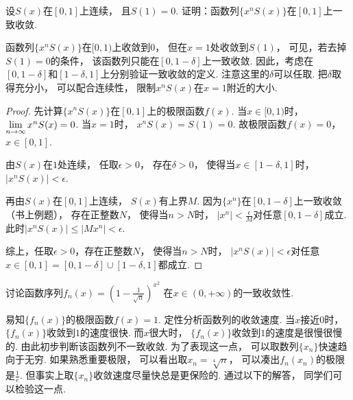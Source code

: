 \begin{example}
\label{ex:ch10-17}
设$S(x)$在$[0,1]$上连续，
        且$S(1)=0$.
        证明：函数列$\{ x^n S(x)\}$在$[0,1]$上一致收敛.
\end{example}

\begin{analysis}
函数列$\{ x^n S(x) \}$在$[0,1)$上收敛到$0$，
    但在$x=1$处收敛到$S(1)$，
    可见，若去掉$S(1)=0$的条件，
    该函数列只能在$[0,1-\delta]$上一致收敛.
    因此，考虑在$[0,1-\delta]$和$[1-\delta,1]$上分别验证一致收敛的定义.
    注意这里的$\delta$可以任取.
    把$\delta$取得充分小，
    可以配合连续性，
    限制$x^n S(x)$在$x=1$附近的大小.
\end{analysis}

\begin{proof}
先计算$\{ x^n S(x) \}$在$[0,1]$上的极限函数$f(x)$.
    当$x \in [0,1)$时，
    $\lim\limits_{n \to \infty} x^n S(x) = 0$.
    当$x=1$时，
    $x^n S(x) = S(1) = 0$.
    故极限函数$f(x) = 0$，$x \in [0,1]$.

    由$S(x)$在$1$处连续，
    任取$\epsilon > 0$，
    存在$\delta > 0$，
    使得当$x \in [1-\delta, 1]$时，
    $|x^n S(x)|< \epsilon$.

    再由$S(x)$在$[0,1]$上连续，
    $S(x)$有上界$M$.
    因为$\{x^n\}$在$[0,1-\delta]$上一致收敛（书上例题），
    存在正整数$N$，
    使得当$n>N$时，
    $|x^n|<\frac{\epsilon}{M}$对任意$[0,1-\delta]$成立.
    此时$|x^n S(x)|\le |Mx^n| < \epsilon$.

    综上，任取$\epsilon > 0$，存在正整数$N$，
    使得当$n>N$时，
    $|x^n S(x)|<\epsilon$对任意$x \in [0,1] = [0,1-\delta]\cup [1-\delta , 1]$都成立.
\end{proof}

\begin{example}
\label{ex:ch10-18}
讨论函数序列$f_n(x) = \left( 1-\frac{1}{\sqrt{n}} \right)^{x^2}$
        在$x \in (0,+\infty)$的一致收敛性.
\end{example}

\begin{analysis}
易知$\{ f_n(x) \}$的极限函数$f(x) = 1$.
    定性分析函数列的收敛速度.
    当$x$接近$0$时，
    $\{f_n(x) \}$收敛到$1$的速度很快.
    而$x$很大时，
    $\{f_n(x) \}$收敛到$1$的速度是很慢很慢的.
    由此初步判断该函数列不一致收敛.
    为了表现这一点，
    可以取数列$\{ x_n \}$快速趋向于无穷.
    如果熟悉重要极限，
    可以看出取$x_n = \sqrt[4]{n}$，
    可以凑出$f_n(x_n)$的极限是$\frac{1}{e}$.
    但事实上取$\{x_n\}$收敛速度尽量快总是更保险的.
    通过以下的解答，
    同学们可以检验这一点.
\end{analysis}

